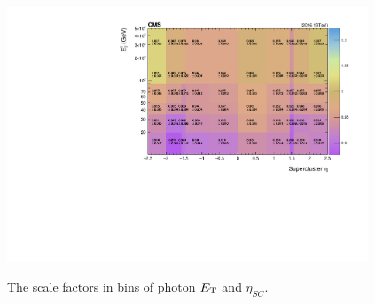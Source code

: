 		
		\begin{figure}[!ht]
		  \centering
		  \includegraphics[width=0.96\textwidth]{Fig/PhoMVAIDSF/EGamma_SF2D}\\
		  \caption{The scale factors in bins of photon $E_{\mathrm{T}}$ and $\eta_{SC}$. \label{fig:PhotonMVASF}}
		\end{figure}
		
		
